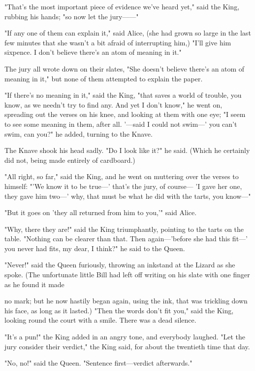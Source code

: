 "That's the most important piece of evidence we've heard yet," said the King, rubbing his hands; "so now let the jury——"

"If any one of them can explain it," said Alice, (she had grown so large in the last few minutes that she wasn't a bit afraid of interrupting him,) "I'll give him sixpence. I don't believe there's an atom of meaning in it."

The jury all wrote down on their slates, "She doesn't believe there's an atom of meaning ​in it," but none of them attempted to explain the paper.

"If there's no meaning in it," said the King, "that saves a world of trouble, you know, as we needn't try to find any. And yet I don't know," he went on, spreading out the verses on his knee, and looking at them with one eye; "I seem to see some meaning in them, after all. '—said I could not swim—' you can't swim, can you?" he added, turning to the Knave.

The Knave shook his head sadly. "Do I look like it?" he said. (Which he certainly did not, being made entirely of cardboard.)

"All right, so far," said the King, and he went on muttering over the verses to himself: "'We know it to be true—' that's the jury, of course— 'I gave her one, they gave him two—' why, that must be what he did with the tarts, you know—"

"But it goes on 'they all returned from him to you,'" said Alice.

"Why, there they are!" said the King triumphantly, pointing to the tarts on the table. "Nothing can be clearer than that. Then again—'before she had this fit—' you never had fits, my dear, I think?" he said to the Queen.

"Never!" said the Queen furiously, throwing an inkstand at the Lizard as she spoke. (The unfortunate little Bill had left off writing on his slate with one finger as he found it made

​no mark; but he now hastily began again, using the ink, that was trickling down his face, as long as it lasted.)
"Then the words don't fit you," said the King, looking round the court with a smile. There was a dead silence.

"It's a pun!" the King added in an angry tone, and everybody laughed. "Let the jury consider their verdict," the King said, for about the twentieth time that day.

"No, no!" said the Queen. "Sentence first—verdict afterwards."


